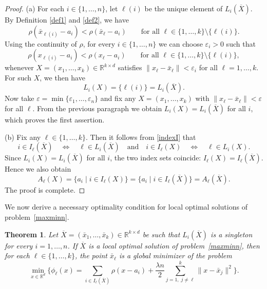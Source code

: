\documentclass[11pt]{article}
\newtheorem{theorem}{Theorem}[section]
\theoremstyle{definition}
\newcommand{\R}{\mathbb{R}}
\newcommand{\1}{\mathbf{1}}
\def\Bar{\overline}
\begin{document}
\begin{proof}
(a) For each $i\in\{1,\dots,n\}$, let $\ell(i)$ be the unique element of
$L_i(\Bar X)$. By Definition \ref{def1} and \ref{def2}, we have
\[
\rho(\bar x_{\ell(i)}-a_i)
<
\rho(\bar x_\ell-a_i)
\qquad\text{for all }\ell\in\{1,\dots,k\}\setminus\{\ell(i)\}.
\]
Using the continuity of $\rho$, for every $i\in \{1,\dots,n\}$ we can choose
$\varepsilon_i>0$ such that
\[
\rho(x_{\ell(i)}-a_i)
<
\rho(x_\ell-a_i)
\qquad\text{for all }\ell\in\{1,\dots,k\}\setminus\{\ell(i)\},
\]
whenever $X=(x_1,\dots,x_k)\in \R^{k\times d}$ satisfies
$\|x_\ell-\bar x_\ell\|<\varepsilon_i$ for all $\ell=1,\dots,k$.
For such $X$, we then have $$L_i(X)=\{\ell(i)\}=L_i(\Bar X).$$
Now take $\varepsilon=\min\{\varepsilon_1,\dots,\varepsilon_n\}$ and fix any
$X=(x_1,\dots,x_k)$ with $\|x_\ell-\bar x_\ell\|<\varepsilon$ for all $\ell$.
From the previous paragraph we obtain $L_i(X)=L_i(\Bar X)$ for all $i$,
which proves the first assertion.

(b) Fix any $\ell\in\{1,\dots,k\}$. Then it follows from \eqref{indexI} that
\[
i\in I_\ell(\Bar X)
\quad\Longleftrightarrow\quad
\ell\in L_i(\Bar X)
\quad\text{and}\quad
i\in I_\ell(X)
\quad\Longleftrightarrow\quad
\ell\in L_i(X).
\]
Since $L_i(X)=L_i(\Bar X)$ for all $i$, the two index sets coincide:
$I_\ell(X)=I_\ell(\Bar X)$. Hence we also obtain
$$A_\ell(X)=\{a_i\mid i\in I_\ell(X)\}=\{a_i\mid i\in I_\ell(\Bar X)\}
=A_\ell(\Bar X).$$ The proof is complete.
\end{proof}


We now derive a necessary optimality condition for local optimal solutions of
problem~\eqref{maxminn}.

\begin{theorem}\label{thm:local}
Let $\Bar X=(\bar x_1,\dots,\bar x_k)\in\mathbb{R}^{k\times d}$ be such that $L_i(\Bar X)$ is a singleton for every $i=1,\dots,n$. If $\Bar X$ is a local optimal solution of problem~\eqref{maxminn}, then for each $\ell\in\{1,\dots,k\}$, the point $\bar x_\ell$ is a global minimizer of the problem
\begin{equation}\label{eq:phi-ell}
\min_{x\in\mathbb{R}^d} \Biggl\{
\phi_\ell(x) = \sum_{i\in I_\ell(\Bar X)}\rho(x-a_i) + \frac{\lambda n}{2} \sum_{j=1,\; j \neq \ell}^k \|x-\bar x_j\|^2
\Biggr\}.
\end{equation}
\end{theorem}
\end{document}
